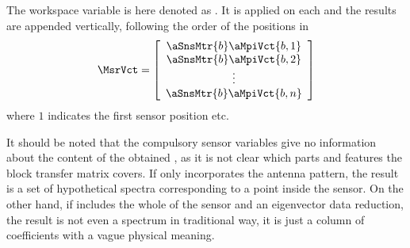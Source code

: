 The workspace variable  is here denoted as
. It is applied on each  and the results are
appended vertically, following the order of the positions in
\begin{equation}
  \MsrVct = \left[ \begin{array}{c} \aSnsMtr{b}\aMpiVct{{b,1}} \\ 
                                    \aSnsMtr{b}\aMpiVct{{b,2}} \\
                                    \vdots                     \\
                                    \aSnsMtr{b}\aMpiVct{{b,n}} 
            \end{array} \right]
  \label{eq:fm_defs:measseq}
\end{equation}
where $1$ indicates the first sensor position etc. 

It should be noted that the compulsory sensor variables give no
information about the content of the obtained \MsrVct, as it is not
clear which parts and features the block transfer matrix covers. If
 only incorporates the antenna pattern, the result is a set
of hypothetical spectra corresponding to a point inside the sensor. On
the other hand, if  includes the whole of the sensor and an
eigenvector data reduction, the result is not even a spectrum in
traditional way, it is just a column of coefficients with a vague
physical meaning.


